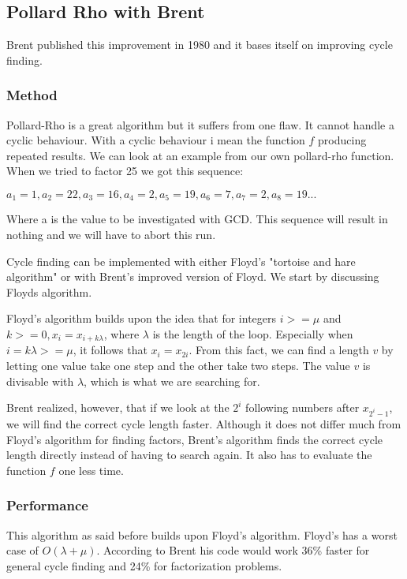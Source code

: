 \documentclass[a4paper, 12pt]{report}
\begin{document}
\subsection{Pollard Rho with Brent}
Brent published this improvement in 1980\cite{brentpdf} and it bases itself on improving cycle finding.
\subsubsection{Method}
Pollard-Rho is a great algorithm but it suffers from one flaw. It cannot handle a cyclic behaviour. With a cyclic behaviour i mean the function $f$ producing repeated results. We can look at an example from our own pollard-rho function. When we tried to factor 25 we got this sequence:
\begin{center}
$a_1=1, a_2=22, a_3=16, a_4=2, a_5=19, a_6=7, a_7=2, a_8=19...$
\end{center}
Where a is the value to be investigated with GCD. This sequence will result in nothing and we will have to abort this run.

Cycle finding can be implemented with either Floyd's "tortoise and hare algorithm" or with Brent's improved version of Floyd. We start by discussing Floyds algorithm. 

Floyd's algorithm builds upon the idea that for integers $i >= \mu$ and $k >= 0, x_i = x_{i + k\lambda}$, where $\lambda$ is the length of the loop. Especially when $i = k\lambda >= \mu$, it follows that $x_i = x_{2i}$. From this fact, we can find a length $v$ by letting one value take one step and the other take two steps. The value $v$ is divisable with $\lambda$, which is what we are searching for. 

Brent realized, however, that if we look at the $2^i$ following numbers after $x_{2^i-1}$, we will find the correct cycle length faster. Although it does not differ much from Floyd's algorithm for finding factors, Brent's algorithm finds the correct cycle length directly instead of having to search again. It also has to evaluate the function $f$ one less time.

\subsubsection{Performance}
This algorithm as said before builds upon Floyd's algorithm. Floyd's has a worst case of $O(\lambda + \mu)$. According to Brent his code would work 36\% faster for general cycle finding and 24\% for factorization problems.
\end{document}
